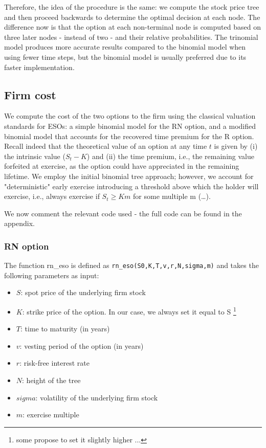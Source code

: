 Therefore, the idea of the procedure is the same: we compute the stock price tree and then proceed backwards to determine the optimal decision at each node. The difference now is that the option at each non-terminal node is computed based on three later nodes - instead of two - and their relative probabilities.
The trinomial model produces more accurate results compared to the binomial model when using fewer time steps, but the binomial model is usually preferred due to its faster implementation.

\subsection{Firm cost} 

We compute the cost of the two options to the firm using the classical valuation standards for ESOs: a simple binomial model for the RN option, and a modified binomial model that accounts for the recovered time premium for the R option.
Recall indeed that the theoretical value of an option at any time $t$ is given by (i) the intrinsic value ($S_t - K$) and (ii) the time premium, i.e., the remaining value forfeited at exercise, as the option could have appreciated in the remaining lifetime. 
We employ the \cite{cox1979option} initial binomial tree approach; however, we account for "deterministic" early exercise introducing a threshold above which the holder will exercise, i.e., always exercise if $S_t \ge Km$ for some multiple m (\dots).

We now comment the relevant code used - the full code can be found in the appendix.

\subsubsection*{RN option}
The function rn\_eso is defined as \verb|rn_eso(S0,K,T,v,r,N,sigma,m)| and takes the following parameters as input:
\begin{itemize}
    \item $S$: spot price of the underlying firm stock
    \item $K$: strike price of the option. In our case, we always set it equal to S \footnote{some propose to set it slightly higher ...}
    \item $T$: time to maturity (in years)
    \item $v$: vesting period of the option (in years)
    \item $r$: risk-free interest rate
    \item $N$: height of the tree
    \item $sigma$: volatility of the underlying firm stock
    \item $m$: exercise multiple
\end{itemize}

